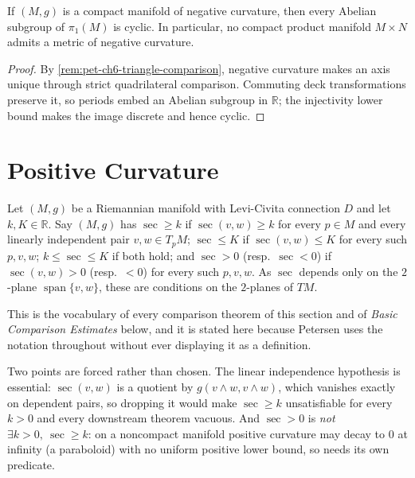 \begin{theorem}
  \label{thm:pet-ch6-preissmann}
  If $(M,g)$ is a compact manifold of negative curvature, then every Abelian
  subgroup of $\pi_1(M)$ is cyclic. In particular, no compact product manifold
  $M\times N$ admits a metric of negative curvature.
\end{theorem}
\begin{proof}
  \sketch
  By \cref{rem:pet-ch6-triangle-comparison}, negative curvature makes an axis unique through strict quadrilateral comparison. Commuting deck transformations preserve it, so periods embed an Abelian subgroup in \(\mathbb R\); the injectivity lower bound makes the image discrete and hence cyclic.
\end{proof}

\section{Positive Curvature}

\begin{definition}
  \label{def:pet-ch6-sec-bounds}
  \leanok
  Let $(M,g)$ be a Riemannian manifold with Levi-Civita connection $D$ and let
  $k,K\in\mathbb{R}$. Say $(M,g)$ has $\sec\ge k$ if $\sec(v,w)\ge k$ for every
  $p\in M$ and every linearly independent pair $v,w\in T_pM$; $\sec\le K$ if
  $\sec(v,w)\le K$ for every such $p,v,w$; $k\le\sec\le K$ if both hold; and
  $\sec>0$ (resp.\ $\sec<0$) if $\sec(v,w)>0$ (resp.\ $<0$) for every such
  $p,v,w$. As $\sec$ depends only on the $2$-plane $\operatorname{span}\{v,w\}$,
  these are conditions on the $2$-planes of $TM$.

  This is the vocabulary of every comparison theorem of this section and of
  \emph{Basic Comparison Estimates} below, and it is stated here because
  Petersen uses the notation throughout without ever displaying it as a
  definition.

  Two points are forced rather than chosen. The linear independence hypothesis
  is essential: $\sec(v,w)$ is a quotient by $g(v\wedge w,v\wedge w)$, which
  vanishes exactly on dependent pairs, so dropping it would make $\sec\ge k$
  unsatisfiable for every $k>0$ and every downstream theorem vacuous. And
  $\sec>0$ is \emph{not} $\exists k>0,\ \sec\ge k$: on a noncompact manifold
  positive curvature may decay to $0$ at infinity (a paraboloid) with no uniform
  positive lower bound, so  needs its own
  predicate.
\end{definition}

